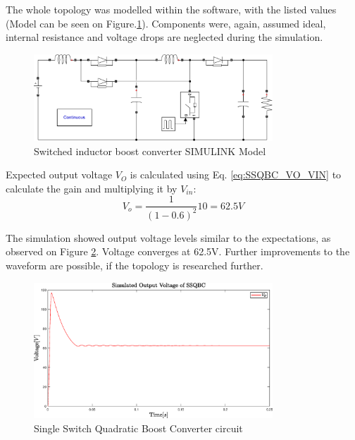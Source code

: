 The whole topology was modelled within the software, with the listed values (Model can be seen on Figure.\ref{fig:Model_SSQBC}). Components were, again, assumed ideal, internal resistance and voltage drops are neglected during the simulation. 

\begin{figure} [H]
   \centering
   \includegraphics[width=0.8\textwidth]{figures/cSingleSwitchQuadraticBC/Model_SSQBC.pdf}
    \caption{Switched inductor boost converter SIMULINK Model}
	\label{fig:Model_SSQBC}
\end{figure}

Expected output voltage $V_O$ is calculated using Eq. \ref{eq:SSQBC_VO_VIN} to calculate the gain and multiplying it by $V_{in}$: 
\begin{equation}
	{V_o}= \frac{1}{(1-0.6)^2}10=62.5V
	\label{eq:Simulation_SSQBC}
\end{equation}

The simulation showed output voltage levels similar to the expectations, as observed on Figure \ref{fig:SSQBC_Model}. Voltage converges at 62.5V. Further improvements to the waveform are possible, if the topology is researched further. 

\begin{figure} [H]
   \centering
   \includegraphics[width=0.8\textwidth]{figures/cSingleSwitchQuadraticBC/Simulation_SSQBC.eps}
    \caption{Single Switch Quadratic Boost Converter circuit}
	\label{fig:SSQBC_Model}
\end{figure}